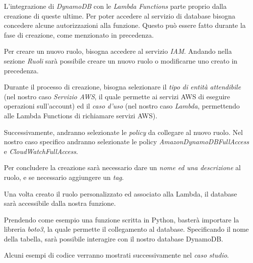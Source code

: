 L'integrazione di \textit{DynamoDB} con le \textit{Lambda Functions} parte proprio dalla creazione di queste ultime. Per poter accedere al servizio di database bisogna concedere alcune autorizzazioni alla funzione. Questo può essere fatto durante la fase di creazione, come menzionato in precedenza.

Per creare un nuovo ruolo, bisogna accedere al servizio \textit{IAM}. Andando nella sezione \textit{Ruoli} sarà possibile creare un nuovo ruolo o modificarne uno creato in precedenza.

Durante il processo di creazione, bisogna selezionare il \textit{tipo di entità attendibile} (nel nostro caso \textit{Servizio AWS}, il quale permette ai servizi AWS di eseguire operazioni sull'account) ed il \textit{caso d'uso} (nel nostro caso \textit{Lambda}, permettendo alle Lambda Functions di richiamare servizi AWS).

Successivamente, andranno selezionate le \textit{policy} da collegare al nuovo ruolo. Nel nostro caso specifico andranno selezionate le policy \textit{AmazonDynamoDBFullAccess} e \textit{CloudWatchFullAccess}.

Per concludere la creazione sarà necessario dare un \textit{nome ed una descrizione} al ruolo, e se necessario aggiungere un \textit{tag}.

Una volta creato il ruolo personalizzato ed associato alla Lambda, il database sarà accessibile dalla nostra funzione.

Prendendo come esempio una funzione scritta in Python, basterà importare la libreria \textit{boto3}, la quale permette il collegamento al database. Specificando il nome della tabella, sarà possibile interagire con il nostro database DynamoDB.

Alcuni esempi di codice verranno mostrati successivamente nel \textit{caso studio}.